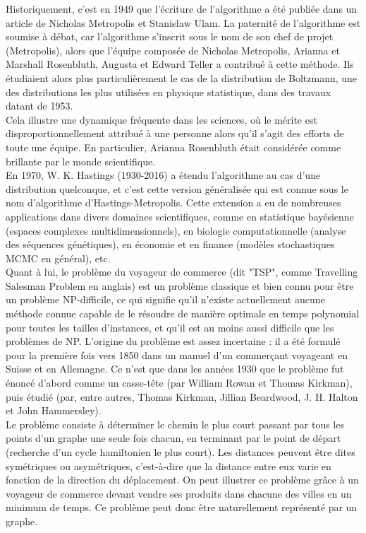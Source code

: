 \documentclass{article}
\begin{document}
Historiquement, c'est en 1949 que l'écriture de l'algorithme a été publiée dans un article de Nicholas Metropolis et Stanisław Ulam. La paternité de l'algorithme est soumise à débat, car l'algorithme s'inscrit sous le nom de son chef de projet (Metropolis), alors que l'équipe composée de Nicholas Metropolis, Arianna et Marshall Rosenbluth, Augusta et Edward Teller a contribué à cette méthode. Ils étudiaient alors plus particulièrement le cas de la distribution de Boltzmann, une des distributions les plus utilisées en physique statistique, dans des travaux datant de 1953. \\
Cela illustre une dynamique fréquente dans les sciences, où le mérite est disproportionnellement attribué à une personne alors qu'il s'agit des efforts de toute une équipe. En particulier, Arianna Rosenbluth était considérée comme brillante par le monde scientifique. \\

En 1970, W. K. Hastings (1930-2016) a étendu l'algorithme au cas d'une distribution quelconque, et c'est cette version généralisée qui est connue sous le nom d'algorithme d'Hastings-Metropolis. Cette extension a eu de nombreuses applications dans divers domaines scientifiques, comme en statistique bayésienne (espaces complexes multidimensionnels), en biologie computationnelle (analyse des séquences génétiques), en économie et en finance (modèles stochastiques MCMC en général), etc. \\

Quant à lui, le problème du voyageur de commerce (dit "TSP", comme Travelling Salesman Problem en anglais) est un problème classique et bien connu pour être un problème NP-difficile, ce qui signifie qu'il n'existe actuellement aucune méthode connue capable de le résoudre de manière optimale en temps polynomial pour toutes les tailles d'instances, et qu'il est au moins aussi difficile que les problèmes de NP. 
L'origine du problème est assez incertaine : il a été formulé pour la première fois vers 1850 dans un manuel d'un commerçant voyageant en Suisse et en Allemagne. Ce n'est que dans les années 1930 que le problème fut énoncé d'abord comme un casse-tête (par William Rowan et Thomas Kirkman), puis étudié (par, entre autres, Thomas Kirkman, Jillian Beardwood, J. H. Halton et John Hammersley). \\ 
Le problème consiste à déterminer le chemin le plus court passant par tous les points d'un graphe une seule fois chacun, en terminant par le point de départ (recherche d'un cycle hamiltonien le plus court). Les distances peuvent être dites symétriques ou asymétriques, c'est-à-dire que la distance entre eux varie en fonction de la direction du déplacement. On peut illustrer ce problème grâce à un voyageur de commerce devant vendre ses produits dans chacune des villes en un minimum de temps. Ce problème peut donc être naturellement représenté par un graphe.\\
\end{document}
